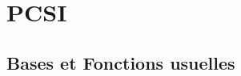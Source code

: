 \documentclass[12 pt]{book}
\begin{document}
\newcommand{\bigzero}{\mbox{\normalfont\Large\bfseries 0}}
\newcommand{\rvline}{\hspace*{-\arraycolsep}\vline\hspace*{-\arraycolsep}}
\newcommand\restr[2]{{%
  \left.\kern-\nulldelimiterspace %
  #1 %
  \vphantom{\big|} %
  \right|_{#2} %
  }}

\newcommand{\SN}{\sum_{i=1}^n}
\newcommand{\SI}{\sum_{n=0}^{+\infty}}
\newcommand{\PN}{\prod_{i=1}^n}
\newcommand{\TI}{\xrightarrow[+\infty]{}}
\newcommand{\LI}{\lim_{n\to +\infty}}
\newcommand{\dt}{\; \text{d}t}
\newcommand{\dx}{\; \text{d}x}


\chapter*{PCSI}
\section*{Bases et Fonctions usuelles} 
\end{document}
